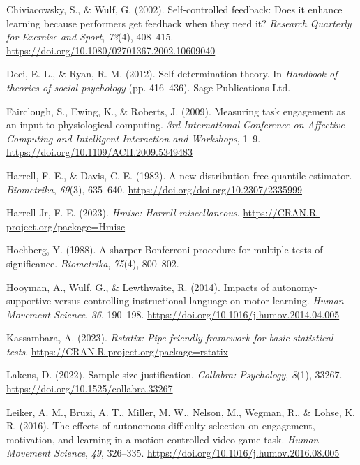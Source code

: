 \documentclass[
  man, donotrepeattitle,mask,floatsintext]{apa7}
\newlength{\cslhangindent}
\newlength{\cslentryspacingunit} %
\newenvironment{CSLReferences}[2] %
 {%
  \setlength{\parindent}{0pt}
  \ifodd #1
  \let\oldpar\par
  \def\par{\hangindent=\cslhangindent\oldpar}
  \fi
  \setlength{\parskip}{#2\cslentryspacingunit}
 }%
 {}
\begin{document}
\begin{CSLReferences}{1}{0}
\leavevmode{}%
Chiviacowsky, S., \& Wulf, G. (2002). Self-controlled feedback: {Does} it enhance learning because performers get feedback when they need it? \emph{Research Quarterly for Exercise and Sport}, \emph{73}(4), 408--415. \url{https://doi.org/10.1080/02701367.2002.10609040}

\leavevmode{}%
Deci, E. L., \& Ryan, R. M. (2012). Self-determination theory. In \emph{Handbook of theories of social psychology} (pp. 416--436). {Sage Publications Ltd}.

\leavevmode{}%
Fairclough, S., Ewing, K., \& Roberts, J. (2009). Measuring task engagement as an input to physiological computing. \emph{3rd {International Conference} on {Affective Computing} and {Intelligent Interaction} and {Workshops}}, 1--9. \url{https://doi.org/10.1109/ACII.2009.5349483}

\leavevmode{}%
Harrell, F. E., \& Davis, C. E. (1982). A new distribution-free quantile estimator. \emph{Biometrika}, \emph{69}(3), 635--640. \url{https://doi.org/doi.org/10.2307/2335999}

\leavevmode{}%
Harrell Jr, F. E. (2023). \emph{Hmisc: Harrell miscellaneous}. \url{https://CRAN.R-project.org/package=Hmisc}

\leavevmode{}%
Hochberg, Y. (1988). A sharper {Bonferroni} procedure for multiple tests of significance. \emph{Biometrika}, \emph{75}(4), 800--802.

\leavevmode{}%
Hooyman, A., Wulf, G., \& Lewthwaite, R. (2014). Impacts of autonomy-supportive versus controlling instructional language on motor learning. \emph{Human Movement Science}, \emph{36}, 190--198. \url{https://doi.org/10.1016/j.humov.2014.04.005}

\leavevmode{}%
Kassambara, A. (2023). \emph{Rstatix: Pipe-friendly framework for basic statistical tests}. \url{https://CRAN.R-project.org/package=rstatix}

\leavevmode{}%
Lakens, D. (2022). Sample size justification. \emph{Collabra: Psychology}, \emph{8}(1), 33267. \url{https://doi.org/10.1525/collabra.33267}

\leavevmode{}%
Leiker, A. M., Bruzi, A. T., Miller, M. W., Nelson, M., Wegman, R., \& Lohse, K. R. (2016). The effects of autonomous difficulty selection on engagement, motivation, and learning in a motion-controlled video game task. \emph{Human Movement Science}, \emph{49}, 326--335. \url{https://doi.org/10.1016/j.humov.2016.08.005}


\end{CSLReferences}
\end{document}
